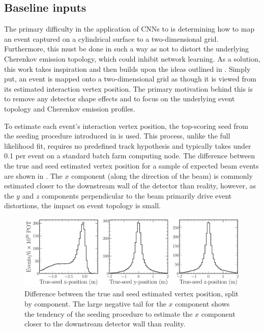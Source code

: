\subsection{Baseline inputs} %
\label{sec:cnn_baseline_inputs} %

The primary difficulty in the application of CNNs to \chips is determining how to map an event
captured on a cylindrical surface to a two-dimensional grid. Furthermore, this must be done in
such a way as not to distort the underlying Cherenkov emission topology, which could inhibit
network learning. As a solution, this work takes inspiration and then builds upon the ideas
outlined in . Simply put, an event is mapped onto a two-dimensional
grid as though it is viewed from its estimated interaction vertex position. The primary motivation
behind this is to remove any detector shape effects and to focus on the underlying event topology
and Cherenkov emission profiles.

To estimate each event's interaction vertex position, the top-scoring seed from the seeding
procedure introduced in  is used. This process, unlike the full
likelihood fit, requires no predefined track hypothesis and typically takes under
\SI{0.1}{} per event on a standard batch farm computing node. The difference between
the true and seed estimated vertex position for a sample of expected beam events are shown in
. The $x$ component (along the direction of the beam) is
commonly estimated closer to the downstream wall of the detector than reality, however, as the $y$
and $z$ components perpendicular to the beam primarily drive event distortions, the impact on
event topology is small.

\begin{figure} %
    \includegraphics[width=\textwidth]{diagrams/7-results/explore_true_reco_vtx.pdf}
    \caption[Difference between the true and seed estimated vertex position]
    {Difference between the true and seed estimated vertex position, split by component. The large
        negative tail for the $x$ component shows the tendency of the seeding procedure to
        estimate the $x$ component closer to the downstream detector wall than reality.}
    \label{fig:explore_true_reco_vtx}
\end{figure}

